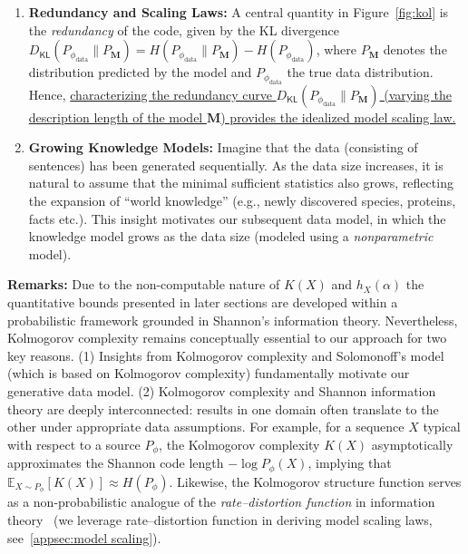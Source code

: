 \documentclass[11pt]{article}
\theoremstyle{plain}
\theoremstyle{definition}
\newcommand{\DKL}{D_{\mathsf{KL}}}
\newcommand{\crossentropy}{H}
\newcommand{\llm}{\boldsymbol{M}}
\newcommand{\dataModel}{\phi_{\text{data}}}
\begin{document}
\begin{enumerate}
\item 
{\bf Redundancy and Scaling Laws:}  
A central quantity in Figure~\ref{fig:kol} is the 
{\em redundancy} of the code, given by the KL divergence \(\DKL(P_{\dataModel}\|P_{\llm}) = \crossentropy(P_{\dataModel}\|P_{\llm}) - H(P_{\dataModel})\), where \(P_{\llm}\) denotes the distribution predicted by the model and \(P_{\dataModel}\) the true data distribution. 
Hence, \uline{characterizing the redundancy curve $\DKL(P_{\dataModel}\|P_{\llm})$ (varying the description length of the model $\llm$) provides the idealized model scaling law.}


\item 
{\bf Growing Knowledge Models:} 
    Imagine that the data (consisting of sentences) has been generated sequentially. As the data size increases, it is natural to assume that the minimal sufficient statistics also grows, reflecting the expansion of “world knowledge” (e.g., newly discovered species, proteins, facts etc.). 
    This insight motivates our subsequent data model, in which the knowledge model grows as the data size (modeled using a {\em nonparametric} model). 
\end{enumerate}


\noindent
{\bf Remarks:}
Due to the non-computable nature of $K(X)$ and $h_X(\alpha)$ the quantitative bounds presented in later sections are developed within a probabilistic framework grounded in Shannon’s information theory. Nevertheless, Kolmogorov complexity remains conceptually essential to our approach for two key reasons.
(1) Insights from Kolmogorov complexity and Solomonoff’s model
(which is based on Kolmogorov complexity) fundamentally motivate our generative data model.
(2) Kolmogorov complexity and Shannon information theory are deeply interconnected: results in one domain often translate to the other under appropriate data assumptions. For example, for a sequence $X$ typical with respect to a source $P_{\phi}$, the Kolmogorov complexity $K(X)$ asymptotically approximates the Shannon code length $-\log P_{\phi}(X)$, implying that $\mathbb{E}_{X \sim P_{\phi}}[K(X)] \approx H(P_{\phi})$. Likewise, the Kolmogorov structure function serves as a non-probabilistic analogue of the {\em rate–distortion function}  in information theory~\citep{grunwald2003kolmogorov}
(we leverage rate–distortion function in 
deriving model scaling laws, see~\cref{appsec:model scaling}). 
\end{document}
